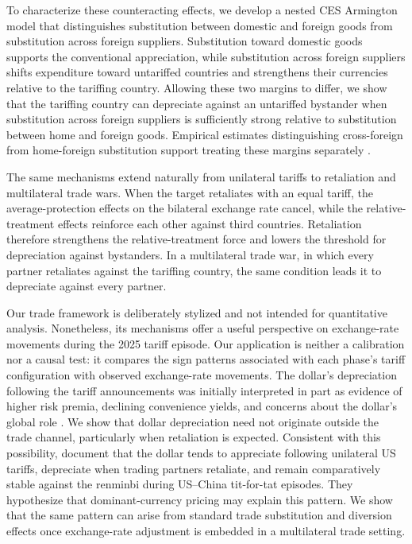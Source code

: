 To characterize these counteracting effects, we develop a nested CES Armington model that distinguishes substitution between domestic and foreign goods from substitution across foreign suppliers. Substitution toward domestic goods supports the conventional appreciation, while substitution across foreign suppliers shifts expenditure toward untariffed countries and strengthens their currencies relative to the tariffing country. Allowing these two margins to differ, we show that the tariffing country can depreciate against an untariffed bystander when substitution across foreign suppliers is sufficiently strong relative to substitution between home and foreign goods. Empirical estimates distinguishing cross-foreign from home-foreign substitution support treating these margins separately \citep{broda2006,feenstra2018,li2022}.

The same mechanisms extend naturally from unilateral tariffs to retaliation and multilateral trade wars. When the target retaliates with an equal tariff, the average-protection effects on the bilateral exchange rate cancel, while the relative-treatment effects reinforce each other against third countries. Retaliation therefore strengthens the relative-treatment force and lowers the threshold for depreciation against bystanders. In a multilateral trade war, in which every partner retaliates against the tariffing country, the same condition leads it to depreciate against every partner.

Our trade framework is deliberately stylized and not intended for quantitative analysis. Nonetheless, its mechanisms offer a useful perspective on exchange-rate movements during the 2025 tariff episode. Our application is neither a calibration nor a causal test: it compares the sign patterns associated with each phase's tariff configuration with observed exchange-rate movements. The dollar's depreciation following the tariff announcements was initially interpreted in part as evidence of higher risk premia, declining convenience yields, and concerns about the dollar's global role \citep{itskhoki2025,kalemliozcan2026}. We show that dollar depreciation need not originate outside the trade channel, particularly when retaliation is expected. Consistent with this possibility, \citet{ostry2025} document that the dollar tends to appreciate following unilateral US tariffs, depreciate when trading partners retaliate, and remain comparatively stable against the renminbi during US--China tit-for-tat episodes. They hypothesize that dominant-currency pricing may explain this pattern. We show that the same pattern can arise from standard trade substitution and diversion effects once exchange-rate adjustment is embedded in a multilateral trade setting.

